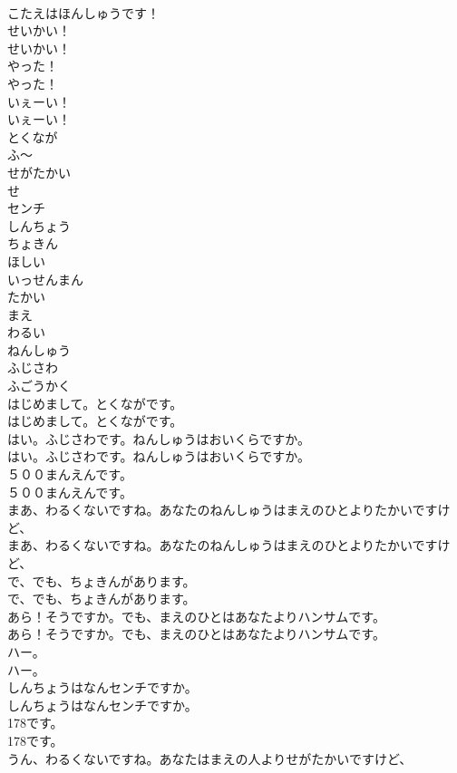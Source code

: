 \documentclass[8pt]{extreport}
\begin{document}
\begin{CJK}{UTF8}{min}
\\	こたえはほんしゅうです！ 
\\	せいかい！	
\\	せいかい！ 
\\	やった！	
\\	やった！ 
\\	いぇーい！	
\\	いぇーい！ 
\\	とくなが
\\	ふ～
\\	せがたかい
\\	せ
\\	センチ
\\	しんちょう
\\	ちょきん
\\	ほしい
\\	いっせんまん
\\	たかい
\\	まえ
\\	わるい
\\	ねんしゅう
\\	ふじさわ
\\	ふごうかく
\\	はじめまして。とくながです。	
\\	はじめまして。とくながです。 
\\	はい。ふじさわです。ねんしゅうはおいくらですか。	
\\	はい。ふじさわです。ねんしゅうはおいくらですか。 
\\	５００まんえんです。	
\\	５００まんえんです。 
\\	まあ、わるくないですね。あなたのねんしゅうはまえのひとよりたかいですけど、	
\\	まあ、わるくないですね。あなたのねんしゅうはまえのひとよりたかいですけど、 
\\	で、でも、ちょきんがあります。	
\\	で、でも、ちょきんがあります。 
\\	あら！そうですか。でも、まえのひとはあなたよりハンサムです。	
\\	あら！そうですか。でも、まえのひとはあなたよりハンサムです。 
\\	ハー。	
\\	ハー。 
\\	しんちょうはなんセンチですか。	
\\	しんちょうはなんセンチですか。 
\\	178です。	
\\	178です。 
\\	うん、わるくないですね。あなたはまえの人よりせがたかいですけど、	

\end{CJK}
\end{document}
